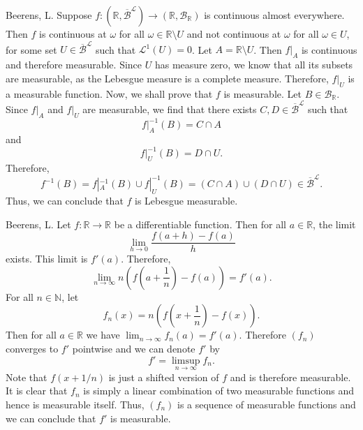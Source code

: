 \begin{solution}[5.20]{Beerens, L.}
    Suppose $f:(\mathbb{R},\overline{\mathcal{B}}^\mathcal{L})\rightarrow(\mathbb{R},\mathcal{B}_\mathbb{R})$ is continuous almost everywhere. Then $f$ is continuous at $\omega$ for all $\omega\in\mathbb{R}\setminus U$ and not continuous at $\omega$ for all $\omega\in U$, for some set $U\in \overline{\mathcal{B}}^\mathcal{L}$ such that $\mathcal{L}^1(U)=0$. Let $A=\mathbb{R}\setminus U$. Then $f|_A$ is continuous and therefore measurable. Since $U$ has measure zero, we know that all its subsets are measurable, as the Lebesgue measure is a complete measure. Therefore, $f|_U$ is a measurable function. Now, we shall prove that $f$ is measurable. Let $B\in\mathcal{B}_\mathbb{R}$. Since $f|_A$ and $f|_U$ are measurable, we find that there exists $C,D\in\overline{\mathcal{B}}^\mathcal{L}$ such that
    $$
        f|_A^{-1}(B) = C\cap A
    $$ 
    and
    $$
        f|_U^{-1}(B) = D\cap U.
    $$
    Therefore,
    $$
        f^{-1}(B) = f|_A^{-1}(B) \cup f|_U^{-1}(B) = (C\cap A) \cup (D\cap U) \in \overline{\mathcal{B}}^\mathcal{L}.
    $$
    Thus, we can conclude that $f$ is Lebesgue measurable.
\end{solution}

\begin{solution}[5.21]{Beerens, L.}
    Let $f:\mathbb{R}\rightarrow\mathbb{R}$ be a differentiable function. Then for all $a\in\mathbb{R}$, the limit 
    $$
        \lim_{h\rightarrow 0}\frac{f(a+h)-f(a)}{h}
    $$
    exists. This limit is $f'(a)$. Therefore, 
    $$
        \lim_{n\rightarrow\infty}n\left(f\left(a+\frac{1}{n}\right)-f(a)\right) = f'(a).
    $$
    For all $n\in\mathbb{N}$, let 
    $$
        f_n(x) = n\left(f\left(x+\frac{1}{n}\right)-f(x)\right).
    $$
    Then for all $a\in\mathbb{R}$ we have $\lim_{n\rightarrow\infty}f_n(a) = f'(a)$. Therefore $(f_n)$ converges to $f'$ pointwise and we can denote $f'$ by 
    $$
        f' = \limsup_{n\rightarrow\infty}f_n.
    $$
    Note that $f(x+1/n)$ is just a shifted version of $f$ and is therefore measurable. It is clear that $f_n$ is simply a linear combination of two measurable functions and hence is measurable itself. Thus, $(f_n)$ is a sequence of measurable functions and we can conclude that $f'$ is measurable.
\end{solution}